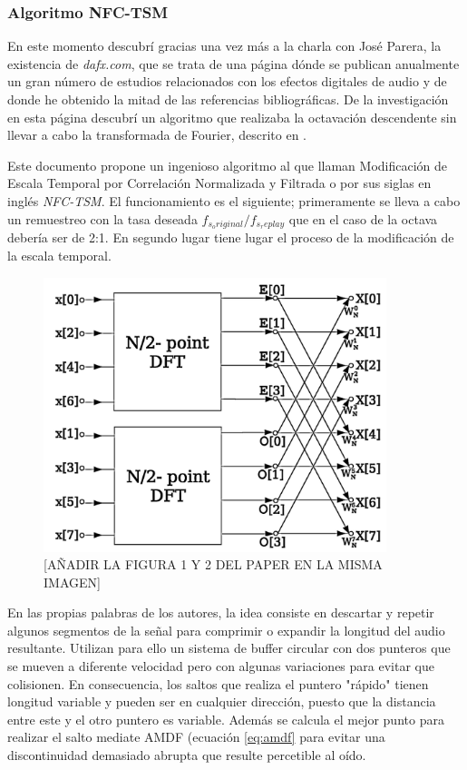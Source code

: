\subsubsection{Algoritmo NFC-TSM}
En este momento descubrí gracias una vez más a la charla con José Parera, la existencia de \emph{dafx.com}, que se trata de una página dónde se publican anualmente un gran número de estudios relacionados con los efectos digitales de audio y de donde he obtenido la mitad de las referencias bibliográficas. De la investigación en esta página descubrí un algoritmo que realizaba la octavación descendente sin llevar a cabo la transformada de Fourier, descrito en \cite{nfctsm}.

Este documento propone un ingenioso algoritmo al que llaman Modificación de Escala Temporal por Correlación Normalizada y Filtrada o por sus siglas en inglés \emph{NFC-TSM}. El funcionamiento es el siguiente; primeramente se lleva a cabo un remuestreo con la tasa deseada $f_{s_original}/f_{s_replay}$ que en el caso de la octava debería ser de 2:1. En segundo lugar tiene lugar el proceso de la modificación de la escala temporal.

\begin{figure}[!ht]
\begin{center}
\includegraphics[width=10cm]{img/dft.png}
\caption{\label{fig:tsm}[AÑADIR LA FIGURA 1 Y 2 DEL PAPER EN LA MISMA IMAGEN]}
\end{center}
\end{figure}

En las propias palabras de los autores, la idea consiste en descartar y repetir algunos segmentos de la señal para comprimir o expandir la longitud del audio resultante. Utilizan para ello un sistema de buffer circular con dos punteros que se mueven a diferente velocidad pero con algunas variaciones para evitar que colisionen. En consecuencia, los saltos que realiza el puntero "rápido" tienen longitud variable y pueden ser en cualquier dirección, puesto que la distancia entre este y el otro puntero es variable. Además se calcula el mejor punto para realizar el salto mediate AMDF (ecuación \ref{eq:amdf} para evitar una discontinuidad demasiado abrupta que resulte percetible al oído. 

